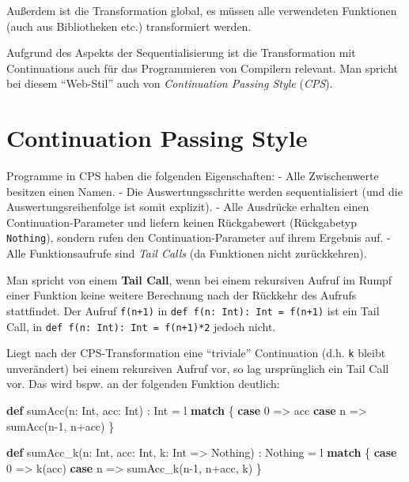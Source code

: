 \documentclass[]{article}
\newenvironment{Shaded}{}{}
\newcommand{\DecValTok}[1]{\textcolor[rgb]{0.25,0.63,0.44}{#1}}
\newcommand{\FunctionTok}[1]{\textcolor[rgb]{0.02,0.16,0.49}{#1}}
\newcommand{\KeywordTok}[1]{\textcolor[rgb]{0.00,0.44,0.13}{\textbf{#1}}}
\newcommand{\NormalTok}[1]{#1}
\begin{document}
Außerdem ist die Transformation global, es müssen alle verwendeten
Funktionen (auch aus Bibliotheken etc.) transformiert werden.

Aufgrund des Aspekts der Sequentialisierung ist die Transformation mit
Continuations auch für das Programmieren von Compilern relevant. Man
spricht bei diesem ``Web-Stil'' auch von \emph{Continuation Passing
Style} (\emph{CPS}).

\hypertarget{continuation-passing-style}{%
\section{Continuation Passing Style}\label{continuation-passing-style}}

Programme in CPS haben die folgenden Eigenschaften: - Alle Zwischenwerte
besitzen einen Namen. - Die Auswertungsschritte werden sequentialisiert
(und die Auswertungsreihenfolge ist somit explizit). - Alle Ausdrücke
erhalten einen Continuation-Parameter und liefern keinen Rückgabewert
(Rückgabetyp \texttt{Nothing}), sondern rufen den Continuation-Parameter
auf ihrem Ergebnis auf. - Alle Funktionsaufrufe sind \emph{Tail Calls}
(da Funktionen nicht zurückkehren).

Man spricht von einem \textbf{Tail Call}, wenn bei einem rekursiven
Aufruf im Rumpf einer Funktion keine weitere Berechnung nach der
Rückkehr des Aufrufs stattfindet. Der Aufruf \texttt{f(n+1)} in
\texttt{def\ f(n:\ Int):\ Int\ =\ f(n+1)} ist ein Tail Call, in
\texttt{def\ f(n:\ Int):\ Int\ =\ f(n+1)*2} jedoch nicht.

Liegt nach der CPS-Transformation eine ``triviale'' Continuation (d.h.
\texttt{k} bleibt unverändert) bei einem rekursiven Aufruf vor, so lag
ursprünglich ein Tail Call vor. Das wird bspw. an der folgenden Funktion
deutlich:

\begin{Shaded}
\begin{Highlighting}[]
\KeywordTok{def} \FunctionTok{sumAcc}\NormalTok{(n: Int, acc: Int) : Int = l }\KeywordTok{match}\NormalTok{ \{}
  \KeywordTok{case} \DecValTok{0}\NormalTok{ =\textgreater{} acc}
  \KeywordTok{case}\NormalTok{ n =\textgreater{} }\FunctionTok{sumAcc}\NormalTok{(n}\DecValTok{{-}1}\NormalTok{, n+acc)}
\NormalTok{\}}

\KeywordTok{def} \FunctionTok{sumAcc\_k}\NormalTok{(n: Int, acc: Int, k: Int =\textgreater{} Nothing) : Nothing = l }\KeywordTok{match}\NormalTok{ \{}
  \KeywordTok{case} \DecValTok{0}\NormalTok{ =\textgreater{} }\FunctionTok{k}\NormalTok{(acc)}
  \KeywordTok{case}\NormalTok{ n =\textgreater{} }\FunctionTok{sumAcc\_k}\NormalTok{(n}\DecValTok{{-}1}\NormalTok{, n+acc, k)}
\NormalTok{\}}
\end{Highlighting}
\end{Shaded}
\end{document}
